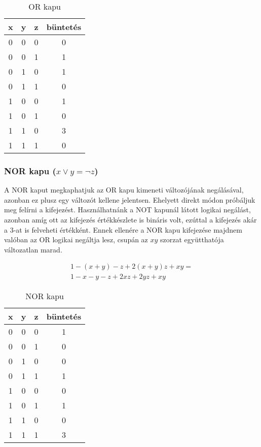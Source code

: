 \begin{table}[ht]
	\footnotesize
	\centering
	\begin{tabular}{ c c c c }
		\toprule
		x & y & z & büntetés \\
		\midrule
		0 & 0 & 0 & 0 \\
		0 & 0 & 1 & 1 \\
		0 & 1 & 0 & 1 \\
		0 & 1 & 1 & 0 \\
		1 & 0 & 0 & 1 \\
		1 & 0 & 1 & 0 \\
		1 & 1 & 0 & 3 \\
		1 & 1 & 1 & 0 \\		
		\bottomrule
	\end{tabular}
	\caption{OR kapu}
	\label{tab:ORgate}
\end{table}

\subsubsection{NOR kapu ($x \vee y = \neg z$)}

A NOR kaput megkaphatjuk az OR kapu kimeneti változójának negálásával, azonban ez plusz egy változót kellene jelentsen. Ehelyett direkt módon próbáljuk meg felírni a kifejezést. Használhatnánk a NOT kapunál látott logikai negálást, azonban amíg ott az kifejezés értékkészlete is bináris volt, ezúttal a kifejezés akár a $3$-at is felveheti értékként. Ennek ellenére a NOR kapu kifejezése majdnem valóban az OR logikai negáltja lesz, csupán az $xy$ szorzat együtthatója változatlan marad.


\begin{align}
	1-(x+y)-z+2(x+y)z+xy = \\
	 1-x-y-z+2xz+2yz+xy
\end{align}

\begin{table}[ht]
	\footnotesize
	\centering
	\begin{tabular}{ c c c c }
		\toprule
		x & y & z & büntetés \\
		\midrule
		0 & 0 & 0 & 1 \\
		0 & 0 & 1 & 0 \\
		0 & 1 & 0 & 0 \\
		0 & 1 & 1 & 1 \\
		1 & 0 & 0 & 0 \\
		1 & 0 & 1 & 1 \\
		1 & 1 & 0 & 0 \\
		1 & 1 & 1 & 3 \\		
		\bottomrule
	\end{tabular}
	\caption{NOR kapu}
	\label{tab:NORgate}
\end{table}

